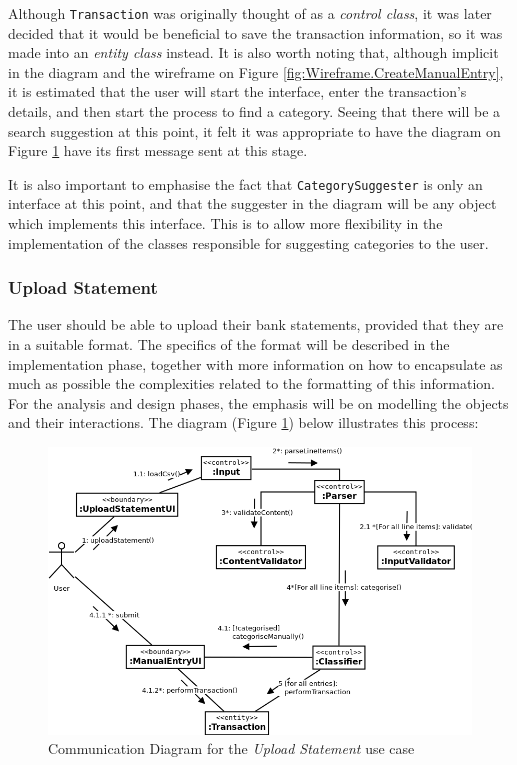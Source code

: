 Although \texttt{Transaction} was originally thought of as a \emph{control
class}, it was later decided that it would be beneficial to save the
transaction information, so it was made into an \emph{entity class} instead.
It is also worth noting that, although implicit in the diagram and the
wireframe on Figure \ref{fig:Wireframe.CreateManualEntry}, it is estimated that
the user will start the interface, enter the transaction's details, and then
start the process to find a category. Seeing that there will be a search
suggestion at this point, it felt it was appropriate to have the diagram on
Figure \ref{fig:CommDiagram.CreateManualEntry} have its first message sent at
this stage.

It is also important to emphasise the fact that \texttt{CategorySuggester} is
only an interface at this point, and that the suggester in the diagram will be
any object which implements this interface. This is to allow more flexibility
in the implementation of the classes responsible for suggesting categories to
the user.

\subsubsection{Upload Statement} \label{sec:AnalysisAndDesign.BusinessLogic.UploadStatement}

The user should be able to upload their bank statements, provided that they are
in a suitable format. The specifics of the format will be described in the
implementation phase, together with more information on how to encapsulate as
much as possible the complexities related to the formatting of this
information.  For the analysis and design phases, the emphasis will be on
modelling the objects and their interactions. The diagram (Figure
\ref{fig:CommDiagram.CreateManualEntry}) below illustrates this process:
\begin{figure}[ht!]
  \begin{center}
    \includegraphics[width=14cm]{./contents/img/Comm_Diagram_-_Upload_Statement.png}
  \end{center}
  \caption{Communication Diagram for the \emph{Upload Statement} use case}
  \label{fig:CommDiagram.CreateManualEntry}
\end{figure}
\FloatBarrier

